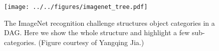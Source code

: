 \begin{figure}[ht]
\centering
\texttt{[image: ../../figures/imagenet\_tree.pdf]}
\caption[The ImageNet recognition challenge structures object categories in a DAG.]{
    The ImageNet recognition challenge structures object categories in a DAG.
    Here we show the whole structure and highlight a few sub-categories.
    (Figure courtesy of Yangqing Jia.)
}\label{fig:imagenet_tree}
\end{figure}
